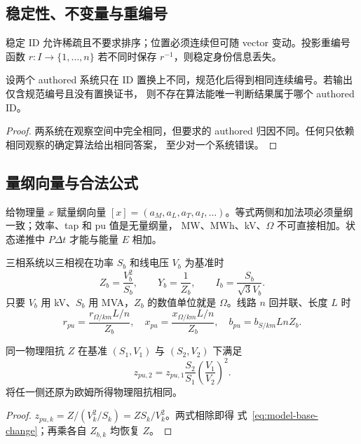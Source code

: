 \subsection{稳定性、不变量与重编号}

稳定 ID 允许稀疏且不要求排序；位置必须连续但可随 vector 变动。投影重编号函数
$r:I\to\{1,\ldots,n\}$ 若不同时保存 $r^{-1}$，则稳定身份信息丢失。

\begin{proposition}[无逆映射时的不可归因性]
设两个 authored 系统只在 ID 置换上不同，规范化后得到相同连续编号。若输出仅含规范编号且没有置换证书，
则不存在算法能唯一判断结果属于哪个 authored ID。
\end{proposition}
\begin{proof}
两系统在观察空间中完全相同，但要求的 authored 归因不同。任何只依赖相同观察的确定算法给出相同答案，
至少对一个系统错误。
\end{proof}

\subsection{量纲向量与合法公式}

给物理量 $x$ 赋量纲向量
$[x]=(a_M,a_L,a_T,a_I,\ldots)$。等式两侧和加法项必须量纲一致；效率、tap 和 pu 值是无量纲量，
MW、MWh、kV、$\Omega$ 不可直接相加。状态递推中 $P\Delta t$ 才能与能量 $E$ 相加。

三相系统以三相视在功率 $S_b$ 和线电压 $V_b$ 为基准时
\begin{equation}
 Z_b=\frac{V_b^2}{S_b},\qquad Y_b=\frac1{Z_b},\qquad
 I_b=\frac{S_b}{\sqrt3V_b}.
 \label{eq:model-base-quantities}
\end{equation}
只要 $V_b$ 用 kV、$S_b$ 用 MVA，$Z_b$ 的数值单位就是 $\Omega$。线路 $n$ 回并联、长度 $L$ 时
\begin{equation}
 r_{pu}=\frac{r_{\Omega/km}L/n}{Z_b},\quad
 x_{pu}=\frac{x_{\Omega/km}L/n}{Z_b},\quad
 b_{pu}=b_{S/km}LnZ_b.
 \label{eq:model-line-pu}
\end{equation}

\begin{theorem}[标幺基准变换]
同一物理阻抗 $Z$ 在基准 $(S_1,V_1)$ 与 $(S_2,V_2)$ 下满足
\begin{equation}
 z_{pu,2}=z_{pu,1}\frac{S_2}{S_1}\left(\frac{V_1}{V_2}\right)^2.
 \label{eq:model-base-change}
\end{equation}
将任一侧还原为欧姆所得物理阻抗相同。
\end{theorem}
\begin{proof}
$z_{pu,k}=Z/(V_k^2/S_k)=ZS_k/V_k^2$。两式相除即得
式~\eqref{eq:model-base-change}；再乘各自 $Z_{b,k}$ 均恢复 $Z$。
\end{proof}

